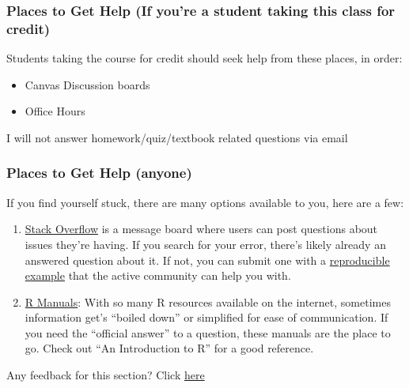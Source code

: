 \documentclass[
]{article}
\providecommand{\tightlist}{%
  \setlength{\itemsep}{0pt}\setlength{\parskip}{0pt}}
\newenvironment{feedback}{
  \specialblock{feedback}{chat-1-fill.png}{Feedback}
}{\endspecialblock}
\begin{document}
\hypertarget{places-to-get-help-if-youre-a-student-taking-this-class-for-credit}{%
\subsubsection{Places to Get Help (If you're a student taking this class for credit)}\label{places-to-get-help-if-youre-a-student-taking-this-class-for-credit}}

Students taking the course for credit should seek help from these places, in order:

\begin{itemize}
\tightlist
\item
  Canvas Discussion boards
\item
  Office Hours
\end{itemize}

I will not answer homework/quiz/textbook related questions via email

\hypertarget{places-to-get-help-anyone}{%
\subsubsection{Places to Get Help (anyone)}\label{places-to-get-help-anyone}}

If you find yourself stuck, there are many options available to you, here are a few:

\begin{enumerate}
\def\labelenumi{\arabic{enumi}.}
\tightlist
\item
  \href{https://stackoverflow.com}{Stack Overflow} is a message board where users can post questions about issues they're having. If you search for your error, there's likely already an answered question about it. If not, you can submit one with a \href{https://stackoverflow.com/questions/5963269/how-to-make-a-great-r-reproducible-example}{reproducible example} that the active community can help you with.
\item
  \href{https://cran.r-project.org/manuals.html}{R Manuals}: With so many R resources available on the internet, sometimes information get's ``boiled down'' or simplified for ease of communication. If you need the ``official answer'' to a question, these manuals are the place to go. Check out ``An Introduction to R'' for a good reference.
\end{enumerate}

\begin{feedback}
Any feedback for this section? Click
\href{https://docs.google.com/forms/d/e/1FAIpQLSePQZ3lIaCIPo9J2owXImHZ_9wBEgTo21A0s-A1ty28u4yfvw/viewform?entry.1684471501=The\%20R\%20Community}{here}
\end{feedback}
\end{document}
